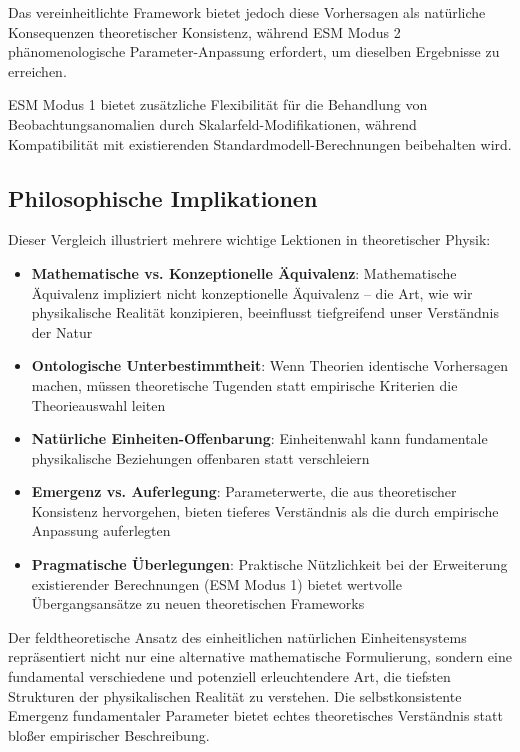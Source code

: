 \documentclass[12pt,a4paper]{article}
\begin{document}
	Das vereinheitlichte Framework bietet jedoch diese Vorhersagen als natürliche Konsequenzen theoretischer Konsistenz, während ESM Modus 2 phänomenologische Parameter-Anpassung erfordert, um dieselben Ergebnisse zu erreichen.
	
	ESM Modus 1 bietet zusätzliche Flexibilität für die Behandlung von Beobachtungsanomalien durch Skalarfeld-Modifikationen, während Kompatibilität mit existierenden Standardmodell-Berechnungen beibehalten wird.
	
	\subsection{Philosophische Implikationen}
	\label{subsec:philosophical_implications}
	
	Dieser Vergleich illustriert mehrere wichtige Lektionen in theoretischer Physik:
	
	\begin{itemize}
		\item \textbf{Mathematische vs. Konzeptionelle Äquivalenz}: Mathematische Äquivalenz impliziert nicht konzeptionelle Äquivalenz – die Art, wie wir physikalische Realität konzipieren, beeinflusst tiefgreifend unser Verständnis der Natur
		\item \textbf{Ontologische Unterbestimmtheit}: Wenn Theorien identische Vorhersagen machen, müssen theoretische Tugenden statt empirische Kriterien die Theorieauswahl leiten
		\item \textbf{Natürliche Einheiten-Offenbarung}: Einheitenwahl kann fundamentale physikalische Beziehungen offenbaren statt verschleiern
		\item \textbf{Emergenz vs. Auferlegung}: Parameterwerte, die aus theoretischer Konsistenz hervorgehen, bieten tieferes Verständnis als die durch empirische Anpassung auferlegten
		\item \textbf{Pragmatische Überlegungen}: Praktische Nützlichkeit bei der Erweiterung existierender Berechnungen (ESM Modus 1) bietet wertvolle Übergangsansätze zu neuen theoretischen Frameworks
	\end{itemize}
	
	Der feldtheoretische Ansatz des einheitlichen natürlichen Einheitensystems repräsentiert nicht nur eine alternative mathematische Formulierung, sondern eine fundamental verschiedene und potenziell erleuchtendere Art, die tiefsten Strukturen der physikalischen Realität zu verstehen. Die selbstkonsistente Emergenz fundamentaler Parameter bietet echtes theoretisches Verständnis statt bloßer empirischer Beschreibung.
	
\end{document}
